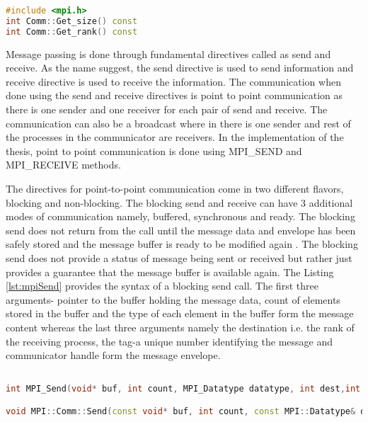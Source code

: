 \begin{lstlisting}[language=C++,label={lst:mpicommSizeRank},caption={MPI Query Functions}]
#include <mpi.h>
int Comm::Get_size() const
int Comm::Get_rank() const
\end{lstlisting}

Message passing is done through fundamental directives called as send and receive. As the name suggest, the send directive is used to send information and receive directive is used to receive the information. The communication when done using the send and receive directives is point to point communication as there is one sender and one receiver for each pair of send and receive. The communication can also be a broadcast where in there is one sender and rest of the processes in the communicator are receivers. In the implementation of the thesis, point to point communication is done using MPI\_SEND and MPI\_RECEIVE methods. \newline

The directives for point-to-point communication come in two different flavors, blocking and non-blocking. The blocking send and receive can have 3 additional modes of communication namely, buffered, synchronous and ready. The blocking send does not return from the call until the message data and envelope has been safely stored and the message buffer is ready to be modified again \cite{mpiMech}. The blocking send does not provide a status of message being sent or received but rather just provides a guarantee that the message buffer is available again.  The Listing \ref{lst:mpiSend} provides the syntax of a blocking send call. The first three arguments- pointer to the buffer holding the message data, count of elements stored in the buffer and the type of each element in the buffer form the message content whereas the last three arguments namely the destination i.e. the rank of the receiving process, the tag-a unique number identifying the message and communicator handle form the message envelope. \newline  

\begin{lstlisting}[language=C++,label={lst:mpiSend},caption={Blocking MPI Send}]

int MPI_Send(void* buf, int count, MPI_Datatype datatype, int dest,int tag, MPI_Comm comm)

void MPI::Comm::Send(const void* buf, int count, const MPI::Datatype& datatype, int dest, int tag) const  	
\end{lstlisting}

